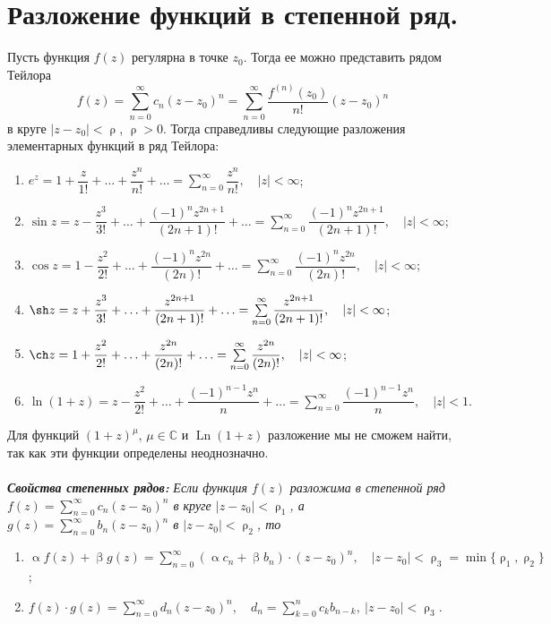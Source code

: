 \documentclass[a4paper, 12pt]{article}
\newcommand{\Cm}{\mathbb{C}}
\renewcommand{\alpha}{\upalpha}
\renewcommand{\beta}{\upbeta}
\newcommand{\Ln}{\operatorname{Ln}}
\renewcommand{\rho}{\uprho}
\newcommand{\sumz}{\sum\limits_{n = 0}^\infty }
\begin{document}
\section{Разложение функций в степенной ряд.}
Пусть функция $f(z)$ регулярна в точке $z_0$. Тогда ее можно представить рядом Тейлора $$f(z) = \sumz c_n(z-z_0)^n = \sumz \dfrac{f^{(n)}(z_0)}{n!}(z-z_0)^n$$
в круге $|z-z_0|<\rho$, $\rho > 0$. Тогда справедливы следующие разложения элементарных функций в ряд Тейлора:\begin{enumerate}
	\item $e^z = 1+\dfrac{z}{1!} +\ldots + \dfrac{z^n}{n!} + \ldots = \sumz \dfrac{z^n}{n!},\quad |z| < \infty$;
	\item $\sin z = z - \dfrac{z^3}{3!} + \ldots + \dfrac{(-1)^nz^{2n + 1}}{(2n+1)!} + \ldots = \sumz \dfrac{(-1)^nz^{2n + 1}}{(2n+1)!}, \quad |z| < \infty$;
	\item $\cos z = 1 - \dfrac{z^2}{2!} + \ldots + \dfrac{(-1)^nz^{2n }}{(2n)!} + \ldots = \sumz \dfrac{(-1)^nz^{2n }}{(2n)!}, \quad |z| < \infty$;
	\item $\sh z = z + \dfrac{z^3}{3!} + \ldots + \dfrac{z^{2n + 1}}{(2n+1)!} + \ldots = \sumz \dfrac{z^{2n + 1}}{(2n+1)!}, \quad |z| < \infty$;
	\item $\ch z = 1 + \dfrac{z^2}{2!} + \ldots + \dfrac{z^{2n }}{(2n)!} + \ldots = \sumz \dfrac{z^{2n }}{(2n)!}, \quad |z| < \infty$;
	\item $\ln (1+z) = z - \dfrac{z^2}{2!} + \ldots + \dfrac{(-1)^{n-1}z^n}{n} + \ldots = \sumz\dfrac{(-1)^{n-1}z^n}{n} ,\quad |z| < 1.$
\end{enumerate}
Для функций $(1+z)^\mu$, $\mu \in \Cm$ и $\Ln(1+z)$ разложение мы не сможем найти, так как эти функции определены неоднозначно.\\\\
\textbf{\textit{Свойства степенных рядов:}}
\textit{Если функция $f(z)$ разложима в степенной ряд $f(z) = \sumz c_n(z-z_0)^n$ в круге $|z-z_0|<\rho_1$, а $g(z) = \sumz b_n(z-z_0)^n$ в $|z-z_0|<\rho_2$, то} \begin{enumerate}
	\item $\alpha f(z) + \beta g(z) = \sumz (\alpha c_n + \beta b_n)\cdot (z-z_0)^n,\quad |z-z_0| < \rho_3=\min \{\rho_1, \rho_2\}$;
	\item $f(z)\cdot g(z) = \sumz d_n(z-z_0)^n,\quad d_n = \sum\limits_{k=0}^n c_kb_{n-k},\ |z-z_0|<\rho_3.$
\end{enumerate} 
\end{document}
